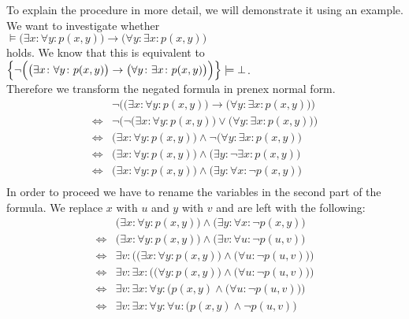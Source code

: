 To explain the procedure in more detail, we will demonstrate it using an example. 
We want to investigate whether 
\\[0.2cm]
\hspace*{1.3cm} 
$\models \big(\exists x\colon \forall y\colon  p(x,y)\big) \rightarrow \big(\forall y\colon \exists x\colon p(x,y)\big)$ \\[0.2cm]
holds. We know that this is equivalent to  \\[0.2cm]
\hspace*{1.3cm} 
$\Big\{ \neg \Big(\big(\exists x\colon \forall y\colon  p(x,y)\big) \rightarrow  \big(\forall y\colon \exists
x\colon p(x,y)\big)\Big)\Big\} \models \bot$.
\\[0.2cm]
Therefore we transform the negated formula in prenex normal form.
$$
\begin{array}{ll}
                  & \neg \Big(\big(\exists x\colon \forall y\colon  p(x,y)\big) \rightarrow \big(\forall y\colon \exists x\colon p(x,y)\big)\Big) \\
  \Leftrightarrow & \neg \Big(\neg \big(\exists x\colon \forall y\colon  p(x,y)\big) \vee \big(\forall y\colon \exists x\colon p(x,y)\big)\Big) \\
  \Leftrightarrow &                \big(\exists x\colon \forall y\colon  p(x,y)\big) \wedge \neg \big(\forall y\colon \exists x\colon p(x,y)\big) \\
  \Leftrightarrow &\big(\exists x\colon \forall y\colon  p(x,y)\big) \wedge  \big(\exists y\colon  \neg \exists x\colon p(x,y)\big) \\
  \Leftrightarrow &\big(\exists x\colon \forall y\colon  p(x,y)\big) \wedge  \big(\exists y\colon  \forall x\colon \neg p(x,y)\big) \\
\end{array}
$$
In order to proceed we have to rename the variables in the second part of the formula.
We replace $x$ with $u$ and $y$ with $v$ and are left with the following:
$$
\begin{array}{ll}
                  &\big(\exists x\colon \forall y\colon  p(x,y)\big) \wedge  \big(\exists y\colon  \forall x\colon \neg p(x,y)\big) \\
  \Leftrightarrow &\big(\exists x\colon \forall y\colon  p(x,y)\big) \wedge  \big(\exists v\colon  \forall u\colon \neg p(u,v)\big) \\
  \Leftrightarrow &\exists v\colon  \Big( \big(\exists x\colon \forall y\colon  p(x,y)\big) \wedge  \big(\forall u\colon \neg p(u,v)\big) \Big)\\
  \Leftrightarrow &\exists v\colon  \exists x\colon  \Big( \big(\forall y\colon  p(x,y)\big) \wedge \big(\forall u\colon \neg p(u,v)\big) \Big)\\
  \Leftrightarrow &\exists v\colon  \exists x\colon \forall y\colon \Big( p(x,y) \wedge \big(\forall u\colon \neg p(u,v)\big) \Big)\\
  \Leftrightarrow &\exists v\colon  \exists x\colon \forall y\colon \forall u\colon \Big( p(x,y) \wedge \neg p(u,v) \Big)\\
\end{array}
$$
